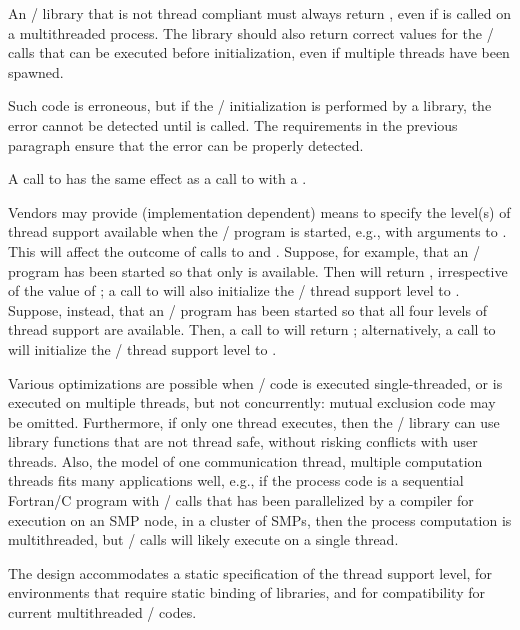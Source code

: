 An \MPI/ library that is not thread compliant must always return
\mpicode{ = }, even if
 is called on a multithreaded process.  The
library should also return correct values for the \MPI/ calls that can
be executed before initialization, even if multiple threads have been
spawned.

\begin{rationale}
Such code is erroneous, but if the \MPI/ initialization is performed
by a library, the error cannot be detected until
 is called. The requirements in the
previous paragraph ensure that the error can be properly detected.
\end{rationale}

A call to  has the same effect as a
call to  with a
\mpicode{ = }.

Vendors may provide (implementation
dependent) means to specify the level(s) of thread support available when the \MPI/
program is started, e.g., with arguments to .  This
will affect the outcome of calls to  and
.  Suppose, for example, that an \MPI/
program has been started so that only  is
available.  Then    will return
\mpicode{ = }, irrespective of the value
of ; a call to  will also
initialize the \MPI/ thread support level  to
.  Suppose, instead, that an
\MPI/ program has been started so that all four levels of thread
support are available.  Then, a call to 
will return \mpicode{ = }; alternatively, a call to
 will initialize the \MPI/ thread support level to
.


\begin{rationale}
Various optimizations are possible when \MPI/ code is executed
single-threaded, or is executed on multiple threads, but not
concurrently:  mutual exclusion code may be omitted. Furthermore, if only one
thread executes, then the \MPI/ library can use library functions that
are not thread safe, without risking conflicts with user threads.
Also, the model
of one communication thread, multiple computation threads fits
many applications well, e.g.,
if the process code is a sequential
Fortran/C program with \MPI/ calls that has been parallelized by a
compiler for execution on an SMP node, in a cluster of SMPs,
then the process computation is
multithreaded, but \MPI/ calls will likely execute on a single
thread.

The design accommodates a static specification of the thread support
level, for environments that require static binding of libraries, and
for compatibility for current multithreaded \MPI/ codes.
\end{rationale}

